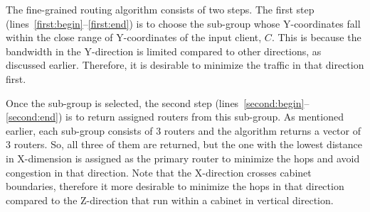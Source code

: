 The fine-grained routing algorithm consists of two steps. The first step
(lines~\ref{first:begin}--\ref{first:end}) is to choose the sub-group whose
Y-coordinates fall within the close range of Y-coordinates of the input client,
$C$. This is because the bandwidth in the Y-direction is limited compared to
other directions, as discussed earlier. Therefore, it is desirable to minimize
the traffic in that direction first. 

Once the sub-group is selected, the second step
(lines~\ref{second:begin}--\ref{second:end}) is to return assigned routers from
this sub-group. As mentioned earlier, each sub-group consists of 3 routers and
the algorithm returns a vector of 3 routers. So, all three of them are
returned, but the one with the lowest distance in X-dimension is assigned as
the primary router to minimize the hops and avoid congestion in that direction.
Note that the X-direction crosses cabinet boundaries, therefore it more
desirable to minimize the hops in that direction compared to the Z-direction
that run within a cabinet in vertical direction.



